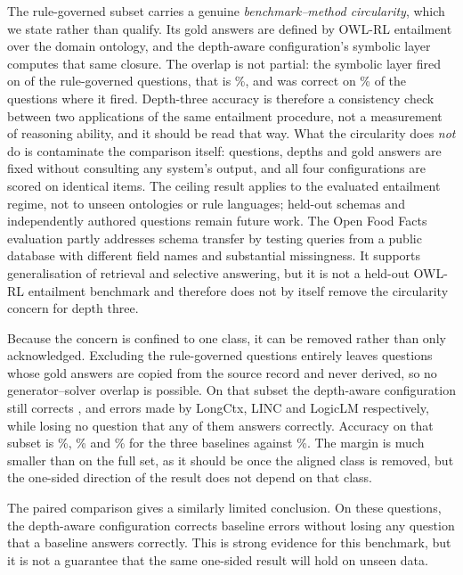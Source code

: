 \documentclass[conference]{IEEEtran}
\newcommand{\revg}[1]{\textcolor{reviewgreen}{#1}}
\begin{document}
\revg{The rule-governed subset carries a genuine \emph{benchmark--method
circularity}, which we state rather than qualify. Its gold answers are defined
by OWL-RL entailment over the domain ontology, and the depth-aware
configuration's symbolic layer computes that same closure. The overlap is not
partial: the symbolic layer fired on \SymFired{} of the \NLogic{} rule-governed
questions, that is \SymFiredPct\%, and was correct on \SymFiredAcc\% of the
questions where it fired. Depth-three accuracy is therefore a consistency check
between two applications of the same entailment procedure, not a measurement of
reasoning ability, and it should be read that way. What the circularity does
\emph{not} do is contaminate the comparison itself: questions, depths and gold
answers are fixed without consulting any system's output, and all four
configurations are scored on identical items. The ceiling result applies to the
evaluated entailment regime, not to unseen ontologies or rule languages;
held-out schemas and independently authored questions remain future work. The Open Food Facts evaluation partly addresses
schema transfer by testing \OffN{} queries from a public database with different
field names and substantial missingness. It supports generalisation of retrieval
and selective answering, but it is not a held-out OWL-RL entailment benchmark
and therefore does not by itself remove the circularity concern for depth
three.}

\revg{Because the concern is confined to one class, it can be removed rather
than only acknowledged. Excluding the rule-governed questions entirely leaves
\NoRuleN{} questions whose gold answers are copied from the source record and
never derived, so no generator--solver overlap is possible. On that subset the
depth-aware configuration still corrects \NoRuleDiscLongCtx{},
\NoRuleDiscLINC{} and \NoRuleDiscLogicLM{} errors made by LongCtx, LINC and
LogicLM respectively, while losing no question that any of them answers
correctly. Accuracy on that subset is \NoRuleLongCtx\%,
\NoRuleLINC\% and \NoRuleLogicLM\% for the three baselines against
\NoRuleSys\%. The margin is much smaller than on the full set, as it should be
once the aligned class is removed, but the one-sided direction of the result
does not depend on that class.}

The paired comparison gives a similarly limited conclusion. On these
\VerifiedN{} questions, the depth-aware configuration corrects baseline errors
without losing any question that a baseline answers correctly. This is strong
evidence for this benchmark, but it is not a guarantee that the same one-sided
result will hold on unseen data.
\end{document}
